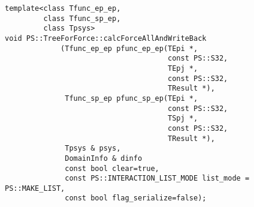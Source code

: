 \begin{screen}
\begin{verbatim}
template<class Tfunc_ep_ep,
         class Tfunc_sp_ep,
         class Tpsys>
void PS::TreeForForce::calcForceAllAndWriteBack
             (Tfunc_ep_ep pfunc_ep_ep(TEpi *,
                                      const PS::S32,
                                      TEpj *,
                                      const PS::S32,
                                      TResult *),
              Tfunc_sp_ep pfunc_sp_ep(TEpi *,
                                      const PS::S32,
                                      TSpj *,
                                      const PS::S32,
                                      TResult *),
              Tpsys & psys,
              DomainInfo & dinfo
              const bool clear=true,
              const PS::INTERACTION_LIST_MODE list_mode = PS::MAKE_LIST,
              const bool flag_serialize=false);
\end{verbatim}
\end{screen}

